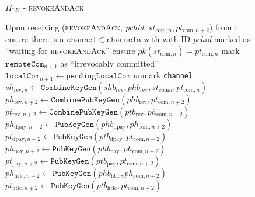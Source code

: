 \begin{figure}[!htbp]
  \begin{protocolbox}{$\Pi_{\mathrm{LN}}$ - \textsc{revokeAndAck}}
    \begin{algorithmic}[1]
      \State Upon receiving (\textsc{revokeAndAck}, \textit{pchid},
      $st_{\mathrm{com}, n}, pt_{\mathrm{com}, n+2}$) from \bob:
      \Indent
        \State ensure there is a $\mathtt{channel} \in \mathtt{channels}$ with
        \bob{} with ID \textit{pchid} marked as ``waiting for
        \textsc{revokeAndAck}''
        \State ensure $pk\left(st_{\mathrm{com}, n}\right) = pt_{\mathrm{com},
        n}$
        \State mark $\mathtt{remoteCom}_{n+1}$ as ``irrevocably committed''
        \State $\mathtt{localCom}_{n+1} \gets \mathtt{pendingLocalCom}$
        \State unmark \texttt{channel}
        \State $sh_{\mathrm{rev}, n} \gets
        \mathtt{CombineKeyGen}\left(shb_{\mathrm{rev}}, phb_{\mathrm{rev}},
        st_{\mathrm{com} n}, pt_{\mathrm{com}, n}\right)$
        \State $ph_{\mathrm{rev}, n+2} \gets
        \mathtt{CombinePubKeyGen}\left(phb_{\mathrm{rev}}, pt_{\mathrm{com},
        n+2}\right)$
        \State $pt_{\mathrm{rev}, n+2} \gets
        \mathtt{CombinePubKeyGen}\left(ptb_{\mathrm{rev}}, ph_{\mathrm{com},
        n+2}\right)$
        \State {}
        \State $ph_{\mathrm{dpay}, n+2} \gets
        \texttt{PubKeyGen}\left(phb_{\mathrm{dpay}}, ph_{\mathrm{com},
        n+2}\right)$
        \State $pt_{\mathrm{dpay}, n+2} \gets
        \texttt{PubKeyGen}\left(ptb_{\mathrm{dpay}}, pt_{\mathrm{com},
        n+2}\right)$
        \State $ph_{\mathrm{pay}, n+2} \gets
        \texttt{PubKeyGen}\left(phb_{\mathrm{pay}}, ph_{\mathrm{com},
        n+2}\right)$
        \State $pt_{\mathrm{pay}, n+2} \gets
        \texttt{PubKeyGen}\left(ptb_{\mathrm{pay}}, pt_{\mathrm{com},
        n+2}\right)$
        \State $ph_{\mathrm{htlc}, n+2} \gets
        \texttt{PubKeyGen}\left(phb_{\mathrm{htlc}}, ph_{\mathrm{com},
        n+2}\right)$
        \State $pt_{\mathrm{htlc}, n+2} \gets
        \texttt{PubKeyGen}\left(ptb_{\mathrm{htlc}}, pt_{\mathrm{com},
        n+2}\right)$
      \EndIndent
    \end{algorithmic}
  \end{protocolbox}
  \caption{}
  \label{alg:protocol:pay:revokeAndAck}
\end{figure}

